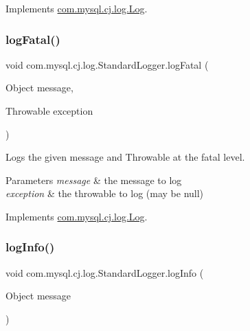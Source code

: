 Implements \mbox{\hyperlink{interfacecom_1_1mysql_1_1cj_1_1log_1_1_log_a4f36fdcde6b1c88a4f1ba25a70555e3f}{com.\+mysql.\+cj.\+log.\+Log}}.

\mbox{\label{classcom_1_1mysql_1_1cj_1_1log_1_1_standard_logger_a69e98cb3f558bb0403c602a83dbb515c}} 
\subsubsection{\texorpdfstring{log\+Fatal()}{logFatal()}\hspace{0.1cm}{\footnotesize\ttfamily [2/2]}}
{\footnotesize\ttfamily void com.\+mysql.\+cj.\+log.\+Standard\+Logger.\+log\+Fatal (\begin{DoxyParamCaption}\item[{Object}]{message,  }\item[{Throwable}]{exception }\end{DoxyParamCaption})}

Logs the given message and Throwable at the \textquotesingle{}fatal\textquotesingle{} level.


\begin{DoxyParams}{Parameters}
{\em message} & the message to log \\
\hline
{\em exception} & the throwable to log (may be null) \\
\hline
\end{DoxyParams}


Implements \mbox{\hyperlink{interfacecom_1_1mysql_1_1cj_1_1log_1_1_log_a54cd5e19bf210ab86b373400e2213229}{com.\+mysql.\+cj.\+log.\+Log}}.

\mbox{\label{classcom_1_1mysql_1_1cj_1_1log_1_1_standard_logger_aeeb1226e65e7183722939e8ae666a910}} 
\subsubsection{\texorpdfstring{log\+Info()}{logInfo()}\hspace{0.1cm}{\footnotesize\ttfamily [1/2]}}
{\footnotesize\ttfamily void com.\+mysql.\+cj.\+log.\+Standard\+Logger.\+log\+Info (\begin{DoxyParamCaption}\item[{Object}]{message }\end{DoxyParamCaption})}

